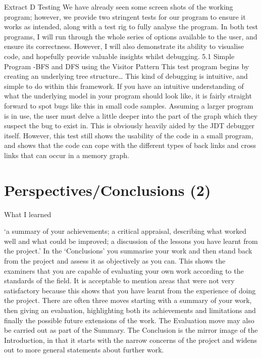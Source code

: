 \documentclass[12pt]{article}
\let\stdsection\section
\renewcommand\section{\newpage\stdsection}
\begin{document}
Extract D Testing 
We have already seen some screen shots of the working program; however, we provide two stringent tests 
for our program to ensure it works as intended, along with a test rig to fully analyse the program. In both test 
programs, I will run through the whole series of options available to the user, and ensure its correctness. 
However, I will also demonstrate its ability to visualise code, and hopefully provide valuable insights whilst 
debugging. 
5.1 Simple Program -BFS and DFS using the Visitor Pattern
This test program begins by creating an underlying tree structure…
This kind of debugging is intuitive, and simple to do within this framework. If you have an intuitive 
understanding of what the underlying model in your program should look like, it is fairly straight forward to 
spot bugs like this in  small code samples. Assuming a larger program is in use, the user must delve a little 
deeper into the part of the graph which they suspect the bug to exist in. This is obviously heavily aided by the 
JDT debugger itself. However, this test still shows the usability of the code in a small program, and shows 
that the code can cope with the different types of back links and cross links that can occur in a memory 
graph.

\section{Perspectives/Conclusions (2)}

What I learned

‘a summary of your achievements; a critical appraisal, describing what worked well and what could be 
improved; a discussion of the lessons you have learnt from the project.’
In the ‘Conclusions’ you summarise your work and then stand back from the project and assess it as 
objectively as you can. This shows the examiners that you are capable of evaluating your own work 
according to the standards of the field. It is acceptable to mention areas that were not very satisfactory
because this shows that you have learnt from the experience of doing the project.
There are often three moves starting with a summary of your work, then giving an evaluation, highlighting
both its achievements and limitations and finally the possible future extensions of the work. The Evaluation 
move may also be carried out as part of the Summary. The Conclusion is the mirror image of the 
Introduction, in that it starts with the narrow concerns of the project and widens out to more general 
statements about further work.
\end{document}

